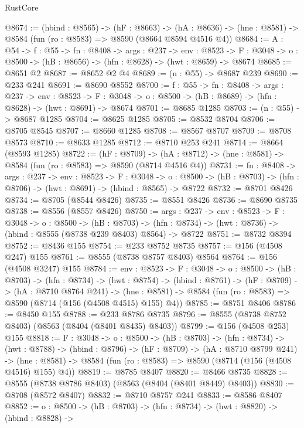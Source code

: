 \begin{lexlean}{RustCore}
\begin{coremodule}
@8674 := (hbind : @8565) ->
  (hF : @8663) ->
  (hA : @8636) -> (hne : @8581) -> @8584 (fun (ro : @8583) => @8590 (@8664 @8594 @4516 @4))
@8684 := {A : @54} ->
  {f : @55} ->
  {fn : @8408} ->
  {args : @237} ->
  {env : @8523} ->
  {F : @3048} -> {o : @8500} -> (hB : @8656) -> (hfn : @8628) -> (hwt : @8659) -> @8674
@8685 := @8651 @2
@8687 := @8652 @2 @4
@8689 := (n : @55) -> @8687 @239
@8690 := @233 @241
@8691 := @8690 @8552
@8700 := {f : @55} ->
  {fn : @8408} ->
  {args : @237} ->
  {env : @8523} ->
  {F : @3048} -> {o : @8500} -> (hB : @8689) -> (hfn : @8628) -> (hwt : @8691) -> @8674
@8701 := @8685 @1285
@8703 := (n : @55) -> @8687 @1285
@8704 := @8625 @1285
@8705 := @8532 @8704
@8706 := @8705 @8545
@8707 := @8660 @1285
@8708 := @8567 @8707
@8709 := @8708 @8573
@8710 := @8633 @1285
@8712 := @8710 @253 @241
@8714 := @8664 (@8593 @1285)
@8722 := (hF : @8709) ->
  (hA : @8712) -> (hne : @8581) -> @8584 (fun (ro : @8583) => @8590 (@8714 @4516 @4))
@8731 := {fn : @8408} ->
  {args : @237} ->
  {env : @8523} ->
  {F : @3048} ->
  {o : @8500} -> (hB : @8703) -> (hfn : @8706) -> (hwt : @8691) -> (hbind : @8565) -> @8722
@8732 := @8701 @8426
@8734 := @8705 (@8544 @8426)
@8735 := @8551 @8426
@8736 := @8690 @8735
@8738 := @8556 (@8557 @8426)
@8750 := {args : @237} ->
  {env : @8523} ->
  {F : @3048} ->
  {o : @8500} ->
  (hB : @8703) ->
  (hfn : @8734) -> (hwt : @8736) -> (hbind : @8555 (@8738 @239 @8403) @8564) -> @8722
@8751 := @8732 @8394
@8752 := @8436 @155
@8754 := @233 @8752 @8735
@8757 := @156 (@4508 @247) @155
@8761 := @8555 (@8738 @8757 @8403) @8564
@8764 := @156 (@4508 @3247) @155
@8784 := {env : @8523} ->
  {F : @3048} ->
  {o : @8500} ->
  (hB : @8703) ->
  (hfn : @8734) ->
  (hwt : @8754) ->
  (hbind : @8761) ->
  (hF : @8709) ->
  (hA : @8710 @8764 @241) ->
  (hne : @8581) -> @8584 (fun (ro : @8583) => @8590 (@8714 (@156 (@4508 @4515) @155) @4))
@8785 := @8751 @8406
@8786 := @8450 @155
@8788 := @233 @8786 @8735
@8796 := @8555 (@8738 @8752 @8403) (@8563 (@8404 (@8401 @8435) @8403))
@8799 := @156 (@4508 @253) @155
@8818 := {F : @3048} ->
  {o : @8500} ->
  (hB : @8703) ->
  (hfn : @8734) ->
  (hwt : @8788) ->
  (hbind : @8796) ->
  (hF : @8709) ->
  (hA : @8710 @8799 @241) ->
  (hne : @8581) -> @8584 (fun (ro : @8583) => @8590 (@8714 (@156 (@4508 @4516) @155) @4))
@8819 := @8785 @8407
@8820 := @8466 @8735
@8828 := @8555 (@8738 @8786 @8403) (@8563 (@8404 (@8401 @8449) @8403))
@8830 := @8708 (@8572 @8407)
@8832 := @8710 @8757 @241
@8833 := @8586 @8407
@8852 := {o : @8500} ->
  (hB : @8703) ->
  (hfn : @8734) ->
  (hwt : @8820) ->
  (hbind : @8828) ->

\end{coremodule}
\end{lexlean}
